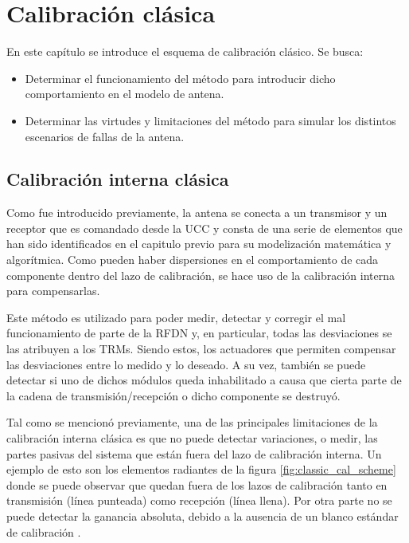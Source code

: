 
\chapter{Calibración clásica}
\label{ch:classicalCalibration}

En este capítulo se introduce el esquema de calibración clásico. Se busca:
\begin{itemize}
	\item Determinar el funcionamiento del método para introducir dicho comportamiento en el modelo de antena. 
	\item Determinar las virtudes y limitaciones del método para simular los distintos escenarios de fallas de la antena.
\end{itemize}


\section{Calibración interna clásica}

Como fue introducido previamente, la antena se conecta a un transmisor y un receptor que es comandado desde la UCC y consta de
una serie de elementos que han sido identificados en el capitulo previo para su modelización matemática y algorítmica. Como 
pueden haber dispersiones en el comportamiento de cada componente dentro del lazo de calibración, se hace uso de la calibración
interna para compensarlas. 

Este método es utilizado para poder medir, detectar y corregir el mal funcionamiento de parte de la RFDN y, en particular, todas
las desviaciones se las atribuyen a los TRMs. Siendo estos, los actuadores que permiten compensar las desviaciones entre lo medido
y lo deseado. A su vez, también se puede detectar si uno de dichos módulos queda inhabilitado a causa que cierta parte de la
cadena de transmisión/recepción o dicho componente se destruyó.

Tal como se mencionó previamente, una de las principales limitaciones de la calibración interna clásica es que no puede
detectar variaciones, o medir, las partes pasivas del sistema que están fuera del lazo de calibración interna. Un ejemplo de
esto son los elementos radiantes de la figura \ref{fig:classic_cal_scheme} donde se puede observar que quedan fuera de los lazos
de calibración tanto en transmisión (línea punteada) como recepción (línea llena). Por otra parte no se puede detectar la
ganancia absoluta, debido a la ausencia de un blanco estándar de calibración \cite{Wang2010}.

